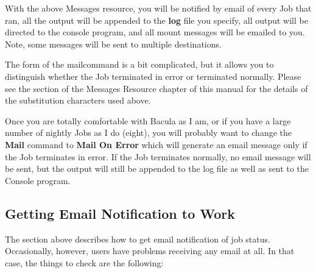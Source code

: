 With the above Messages resource, you will be notified by email of every Job
that ran, all the output will be appended to the {\bf log} file you specify,
all output will be directed to the console program, and all mount messages
will be emailed to you. Note, some messages will be sent to multiple
destinations. 

The form of the mailcommand is a bit complicated, but it allows you to
distinguish whether the Job terminated in error or terminated normally. Please
see the 
 section of the Messages
Resource chapter of this manual for the details of the substitution characters
used above. 

Once you are totally comfortable with Bacula as I am, or if you have a large
number of nightly Jobs as I do (eight), you will probably want to change the
{\bf Mail} command to {\bf Mail On Error} which will generate an email message
only if the Job terminates in error. If the Job terminates normally, no email
message will be sent, but the output will still be appended to the log file as
well as sent to the Console program. 

\subsection*{Getting Email Notification to Work}
\label{email}

The section above describes how to get email notification of job status.
Occasionally, however, users have problems receiving any email at all. In that
case, the things to check are the following: 

